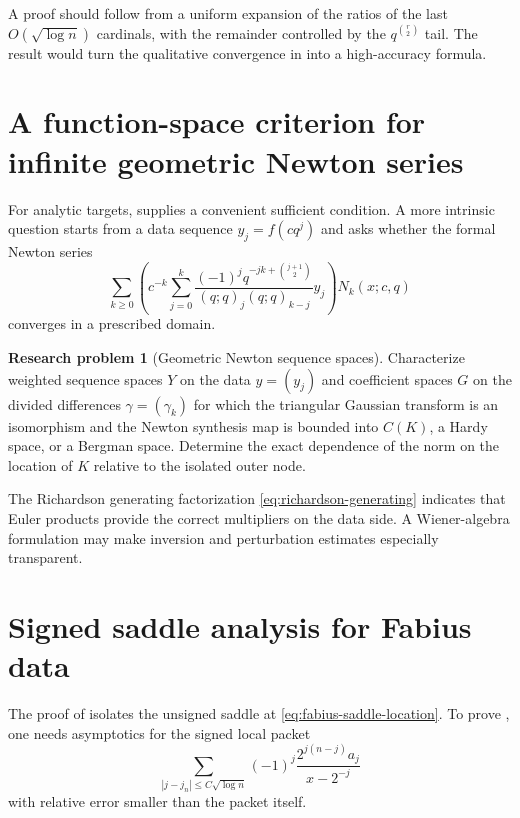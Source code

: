 \documentclass[11pt,oneside]{book}
\numberwithin{equation}{chapter}
\theoremstyle{definition}
\newtheorem{problem}[theorem]{Research problem}
\theoremstyle{remark}
\begin{document}
A proof should follow from a uniform expansion of the ratios of the last
$O(\sqrt{\log n})$ cardinals, with the remainder controlled by the
$q^{\binom r2}$ tail.  The result would turn the qualitative convergence in
 into a high-accuracy formula.

\section{A function-space criterion for infinite geometric Newton series}

For analytic targets,  supplies a
convenient sufficient condition.  A more intrinsic question starts from a
data sequence $y_j=f(cq^j)$ and asks whether the formal Newton series
\begin{equation}
 \sum_{k\ge0}
 \left(c^{-k}\sum_{j=0}^k
 \frac{(-1)^jq^{-jk+\binom{j+1}{2}}}
 {(q;q)_j(q;q)_{k-j}}y_j\right)N_k(x;c,q)
 \label{eq:formal-data-newton-series}
\end{equation}
converges in a prescribed domain.

\begin{problem}[Geometric Newton sequence spaces]
\label{prob:newton-sequence-spaces}
Characterize weighted sequence spaces $Y$ on the data $y=(y_j)$ and
coefficient spaces $G$ on the divided differences $\gamma=(\gamma_k)$ for
which the triangular Gaussian transform is an isomorphism and the Newton
synthesis map is bounded into $C(K)$, a Hardy space, or a Bergman space.
Determine the exact dependence of the norm on the location of $K$ relative
to the isolated outer node.
\end{problem}

The Richardson generating factorization
\eqref{eq:richardson-generating} indicates that Euler products provide the
correct multipliers on the data side.  A Wiener-algebra formulation may
make inversion and perturbation estimates especially transparent.

\section{Signed saddle analysis for Fabius data}

The proof of  isolates the unsigned saddle at
\eqref{eq:fabius-saddle-location}.  To prove
, one needs asymptotics for the signed local
packet
\begin{equation}
 \sum_{|j-j_n|\le C\sqrt{\log n}}
 (-1)^j\frac{2^{j(n-j)}a_j}{x-2^{-j}}
 \label{eq:signed-local-saddle-packet}
\end{equation}
with relative error smaller than the packet itself.
\end{document}
